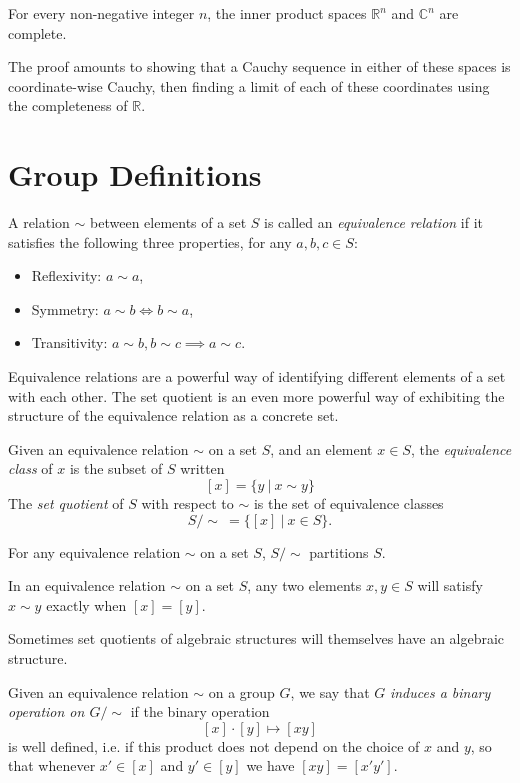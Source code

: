 \begin{prop}
	For every non-negative integer $n$, the inner product spaces $\mathbb{R}^n$ and $\mathbb{C}^n$ are complete.
\end{prop}
The proof amounts to showing that a Cauchy sequence in either of these spaces is coordinate-wise Cauchy, then finding a limit of each of these coordinates using the completeness of $\mathbb{R}$.

\section{Group Definitions}

\begin{define}
	A relation $\sim$ between elements of a set $S$ is called an \emph{equivalence relation} if it satisfies the following three properties, for any $a, b, c \in S$:
	\begin{itemize}
		\item Reflexivity: $a \sim a$,
		\item Symmetry: $a \sim b \iff b \sim a$,
		\item Transitivity: $a \sim b, b \sim c \implies a \sim c$.
	\end{itemize}
\end{define}

Equivalence relations are a powerful way of identifying different elements of a set with each other. The set quotient is an even more powerful way of exhibiting the structure of the equivalence relation as a concrete set.

\begin{define}
	Given an equivalence relation $\sim$ on a set $S$, and an element $x \in S$, the \emph{equivalence class} of $x$ is the subset of $S$ written
	\[[x] = \{y\ |\ x \sim y\}\]
	The \emph{set quotient} of $S$ with respect to $\sim$ is the set of equivalence classes
	\[S/\sim \ = \{[x]\ |\ x \in S\}.\]
\end{define}

\begin{prop}
	For any equivalence relation $\sim$ on a set $S$, $S/\sim$ partitions $S$.
\end{prop}

\begin{prop}
	In an equivalence relation $\sim$ on a set $S$, any two elements $x, y \in S$ will satisfy $x \sim y$ exactly when $[x] = [y]$.
\end{prop}

Sometimes set quotients of algebraic structures will themselves have an algebraic structure.
\begin{define}
	Given an equivalence relation $\sim$ on a group $G$, we say that $G$ \emph{induces a binary operation on $G/\sim$} if the binary operation
	\[[x]\cdot[y] \mapsto [xy]\]
	is well defined, i.e. if this product does not depend on the choice of $x$ and $y$, so that whenever $x' \in [x]$ and $y' \in [y]$ we have $[xy] = [x'y']$.
\end{define}


